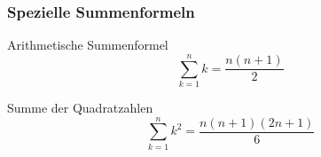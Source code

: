 \vspace{-\topsep}

\subsubsection{Spezielle Summenformeln}

\begin{multicols}{2}
    \begin{definition}{Arithmetische Summenformel}
        \[\sum_{k=1}^n k = \frac{n(n+1)}{2}\]
    \end{definition}
    \begin{definition}{Summe der Quadratzahlen}
        \[\sum_{k=1}^n k^2 = \frac{n(n+1)(2n+1)}{6}\]
    \end{definition}
\end{multicols}